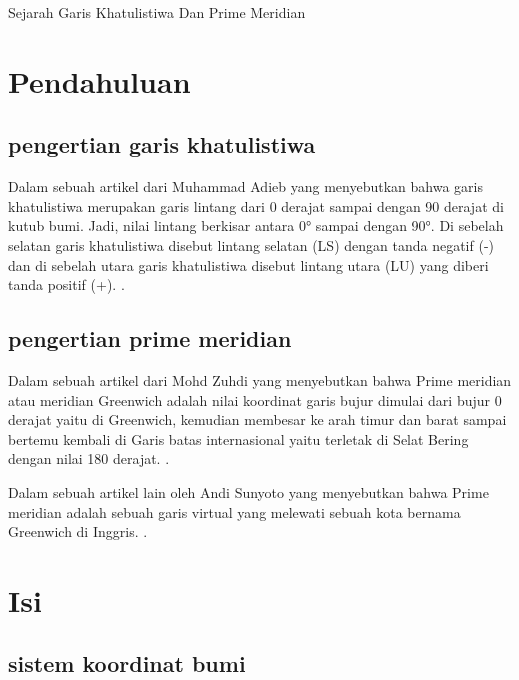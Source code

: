    
								   
								   
												           Sejarah Garis Khatulistiwa Dan Prime Meridian

														   
\section {Pendahuluan}

\subsection{pengertian garis khatulistiwa}	

	Dalam sebuah artikel dari Muhammad Adieb yang menyebutkan bahwa garis khatulistiwa merupakan garis lintang dari 0 derajat sampai dengan 90 derajat 
di kutub bumi. Jadi, nilai lintang berkisar antara 0° sampai dengan 90°. Di sebelah selatan garis khatulistiwa disebut lintang selatan (LS) dengan 
tanda negatif (-) dan di sebelah utara garis khatulistiwa disebut lintang utara (LU) yang diberi tanda positif (+). \cite {adieb2014studi}.

\subsection{pengertian prime meridian}
	
	Dalam sebuah artikel dari Mohd Zuhdi yang menyebutkan bahwa Prime meridian atau meridian Greenwich adalah nilai koordinat garis bujur dimulai dari 
bujur 0 derajat yaitu di Greenwich, kemudian membesar ke arah timur dan barat sampai bertemu kembali di Garis batas internasional yaitu terletak 
di Selat Bering dengan nilai 180 derajat. \cite {zuhdi2012sistem}.

	Dalam sebuah artikel lain oleh Andi Sunyoto yang menyebutkan bahwa Prime meridian adalah sebuah garis virtual yang melewati sebuah kota 
bernama Greenwich di Inggris. \cite{sunyoto2009api}.

\section {Isi}

\subsection{sistem koordinat bumi}
	
